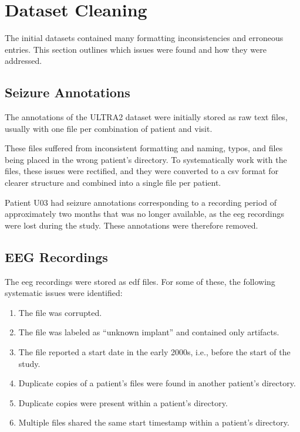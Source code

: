 \section{Dataset Cleaning}\label{sec:dataset-cleaning}
The initial datasets contained many formatting inconsistencies and erroneous entries.
This section outlines which issues were found and how they were addressed.


\subsection{Seizure Annotations}\label{subsec:seizure-annotations}
The annotations of the ULTRA2 dataset were initially stored as raw text files, usually with one file per combination of patient and visit.

These files suffered from inconsistent formatting and naming, typos, and files being placed in the wrong patient's directory.
To systematically work with the files, these issues were rectified, and they were converted to a \gls{csv} format for clearer structure and combined into a single file per patient.

Patient U03 had seizure annotations corresponding to a recording period of approximately two months that was no longer available, as the \gls{eeg} recordings were lost during the study.
These annotations were therefore removed.


\subsection{EEG Recordings}\label{subsec:eeg-recordings}
The \gls{eeg} recordings were stored as \gls{edf} files.
For some of these, the following systematic issues were identified:
\begin{enumerate}
    \item \label{itm:corrupted} The file was corrupted.
    \item \label{itm:unknown} The file was labeled as ``unknown implant'' and contained only artifacts.
    \item \label{itm:startdate} The file reported a start date in the early 2000s, i.e., before the start of the study.
    \item \label{itm:dup-different-pdir} Duplicate copies of a patient's files were found in another patient's directory.
    \item \label{itm:dup-same-pdir} Duplicate copies were present within a patient's directory.
    \item \label{itm:dup-start} Multiple files shared the same start timestamp within a patient's directory.
\end{enumerate}

